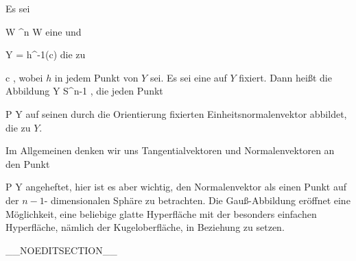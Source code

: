 
{}
{

Es sei

\mavergleichskette
{\vergleichskette
{ W
}
{ \subseteq }{ \R^n
}
{  }{
}
{    }{
}
{   }{
}
}
{}{}{}
 { W } { \R
} {}
eine
und

\mavergleichskette
{\vergleichskette
{ Y
}
{ = }{ h^{-1}(c)
}
{  }{
}
{    }{
}
{   }{
}
}
{}{}{}
die
zu

\mavergleichskette
{\vergleichskette
{ c
}
{ \in }{ \R
}
{  }{
}
{    }{
}
{   }{
}
}
{}{}{,}
wobei $h$ in jedem Punkt von $Y$
sei. Es sei eine
auf $Y$ fixiert. Dann heißt die Abbildung
\maabbdisp {} { Y } { S^{n-1}
} {,}
die jeden Punkt

\mavergleichskette
{\vergleichskette
{ P
}
{ \in }{ Y
}
{  }{
}
{    }{
}
{   }{
}
}
{}{}{}
auf seinen durch die Orientierung fixierten Einheitsnormalenvektor abbildet, die
zu $Y$.

}

Im Allgemeinen denken wir uns Tangentialvektoren und Normalenvektoren an den Punkt

\mavergleichskette
{\vergleichskette
{ P
}
{ \in }{ Y
}
{  }{
}
{    }{
}
{   }{
}
}
{}{}{}
angeheftet, hier ist es aber wichtig, den Normalenvektor als einen Punkt auf der  $n-1$- dimensionalen Sphäre zu betrachten. Die Gauß-Abbildung eröffnet eine Möglichkeit, eine beliebige glatte Hyperfläche mit der besonders einfachen Hyperfläche, nämlich der Kugeloberfläche, in Beziehung zu setzen.

__NOEDITSECTION__

